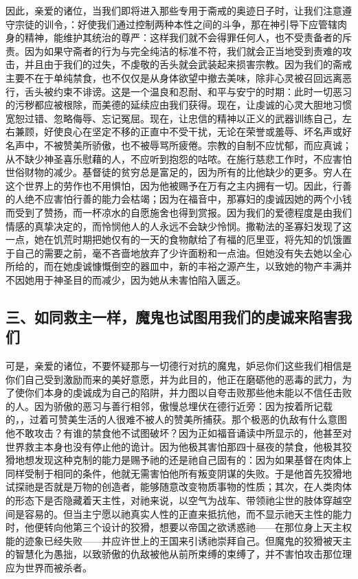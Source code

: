 因此，亲爱的诸位，当我们即将进入那些专用于斋戒的奥迹日子时，让我们注意遵守宗徒的训令，：好使我们通过控制两种本性之间的斗争，那在神引导下应管辖肉身的精神，能维护其统治的尊严：这样我们就不会得罪任何人，也不受责备者的斥责。因为如果守斋者的行为与完全纯洁的标准不符，我们就会正当地受到责难的攻击，并且由于我们的过失，不虔敬的舌头就会武装起来损害宗教。因为我们的斋戒主要不在于单纯禁食，也不仅仅是从身体欲望中撤去美味，除非心灵被召回远离恶行，舌头被约束不诽谤。这是一个温良和忍耐、和平与安宁的时期：此时一切恶习的污秽都应被根除，而美德的延续应由我们获得。现在，让虔诚的心灵大胆地习惯宽恕过错、忽略侮辱、忘记冤屈。现在，让忠信的精神以正义的武器训练自己，左右兼顾，好使良心在坚定不移的正直中不受干扰，无论在荣誉或羞辱、坏名声或好名声中，不被赞美所骄傲，也不被辱骂所疲倦。宗教的自制不应忧郁，而应真诚；从不缺少神圣喜乐慰藉的人，不应听到抱怨的咕哝。在施行慈悲工作时，不应害怕世俗财物的减少。基督徒的贫穷总是富足的，因为所有的比他缺少的更多。穷人在这个世界上的劳作也不用惧怕，因为他被赐予在万有之主内拥有一切。因此，行善的人绝不应害怕行善的能力会枯竭；因为在福音中，那寡妇的虔诚因她的两个小钱而受到了赞扬，而一杯凉水的自愿施舍也得到赏报。因为我们的爱德程度是由我们情感的真挚决定的，而怜悯他人的人永远不会缺少怜悯。撒勒法的圣寡妇发现了这一点，她在饥荒时期把她仅有的一天的食物献给了有福的厄里亚，将先知的饥饿置于自己的需要之前，毫不吝啬地放弃了少许面粉和一点油。但她没有失去她以全心所给的，而在她虔诚慷慨倒空的器皿中，新的丰裕之源产生，以致她的物产丰满并不因她用于神圣目的而减少，因为她从未害怕陷入匮乏。\par


\subsection{三、如同救主一样，魔鬼也试图用我们的虔诚来陷害我们}

可是，亲爱的诸位，不要怀疑那与一切德行对抗的魔鬼，妒忌你们这些我们相信是你们自己受到激励而来的美好意愿，并为此目的，他正在磨砺他的恶毒的武力，为了使你们本身的虔诚成为自己的陷阱，并力图以自夸击败那些他未能以不信任击败的人。因为骄傲的恶习与善行相邻，傲慢总埋伏在德行近旁：因为按着所记载的，，过着可赞美生活的人很难不被人的赞美所捕获。那个极恶的仇敌有什么意图他不敢攻击？有谁的禁食他不试图破坏？因为正如福音诵读中所显示的，他甚至对世界救主本身也没有停止他的诡计。因为他极其害怕那四十昼夜的禁食，他极其狡猾地想发现这种克制的能力是赐予祂的还是祂自己固有的：因为如果基督在肉体上同样受制于相同的条件，他就无需害怕他所有叛变阴谋的失败。于是他首先狡猾地试探祂是否就是万物的创造者，能够随意改变物质事物的性质；其次，在人类肉体的形态下是否隐藏着天主性，对祂来说，以空气为战车、带领祂尘世的肢体穿越空间是容易的。但当主宁愿以祂真实人性的正直来抵抗他，而不显示祂天主性的能力时，他便转向他第三个设计的狡猾，想要以帝国之欲诱惑祂——在那位身上天主权能的迹象已经失败——并应许世上的王国来引诱祂崇拜自己。但魔鬼的狡猾被天主的智慧化为愚拙，以致骄傲的仇敌被他从前所束缚的束缚了，并不害怕攻击那位理应为世界而被杀者。\par

